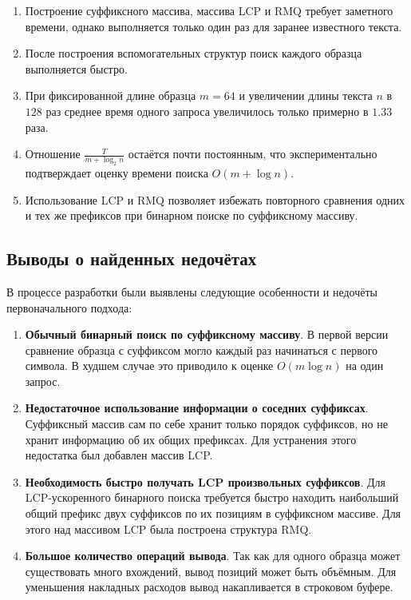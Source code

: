 \begin{enumerate}
    \item Построение суффиксного массива, массива LCP и RMQ требует заметного времени, однако выполняется только один раз для заранее известного текста.
    
    \item После построения вспомогательных структур поиск каждого образца выполняется быстро.
    
    \item При фиксированной длине образца \(m = 64\) и увеличении длины текста \(n\) в \(128\) раз среднее время одного запроса увеличилось только примерно в \(1.33\) раза.
    
    \item Отношение \(\frac{T}{m + \log_2 n}\) остаётся почти постоянным, что экспериментально подтверждает оценку времени поиска \(O(m + \log n)\).
    
    \item Использование LCP и RMQ позволяет избежать повторного сравнения одних и тех же префиксов при бинарном поиске по суффиксному массиву.
\end{enumerate}

\subsection{Выводы о найденных недочётах}

В процессе разработки были выявлены следующие особенности и недочёты первоначального подхода:

\begin{enumerate}
    \item \textbf{Обычный бинарный поиск по суффиксному массиву}. 
    В первой версии сравнение образца с суффиксом могло каждый раз начинаться с первого символа. 
    В худшем случае это приводило к оценке \(O(m \log n)\) на один запрос.

    \item \textbf{Недостаточное использование информации о соседних суффиксах}. 
    Суффиксный массив сам по себе хранит только порядок суффиксов, но не хранит информацию об их общих префиксах. 
    Для устранения этого недостатка был добавлен массив LCP.

    \item \textbf{Необходимость быстро получать LCP произвольных суффиксов}. 
    Для LCP-ускоренного бинарного поиска требуется быстро находить наибольший общий префикс двух суффиксов по их позициям в суффиксном массиве. 
    Для этого над массивом LCP была построена структура RMQ.

    \item \textbf{Большое количество операций вывода}. 
    Так как для одного образца может существовать много вхождений, вывод позиций может быть объёмным. 
    Для уменьшения накладных расходов вывод накапливается в строковом буфере.
\end{enumerate}

\pagebreak